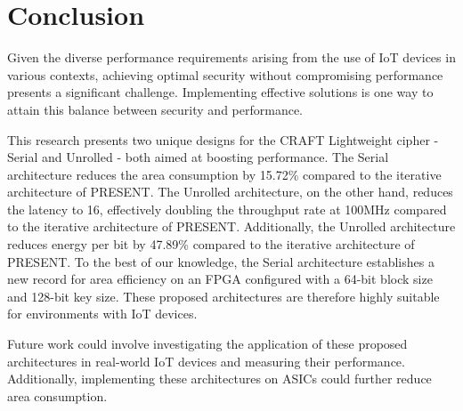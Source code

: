 \documentclass[final,5p,times,twocolumn]{elsarticle}
\begin{document}
\section{Conclusion}\label{sec6}

Given the diverse performance requirements arising from the use of IoT devices in various contexts, achieving optimal security without compromising performance presents a significant challenge. Implementing effective solutions is one way to attain this balance between security and performance.

This research presents two unique designs for the CRAFT Lightweight cipher - Serial and Unrolled - both aimed at boosting performance.
The Serial architecture reduces the area consumption by 15.72\% compared to the iterative architecture of PRESENT.
The Unrolled architecture, on the other hand, reduces the latency to 16, effectively doubling the throughput rate at 100MHz compared to the iterative architecture of PRESENT.
Additionally, the Unrolled architecture reduces energy per bit by 47.89\% compared to the iterative architecture of PRESENT.
To the best of our knowledge, the Serial architecture establishes a new record for area efficiency on an FPGA configured with a 64-bit block size and 128-bit key size.
These proposed architectures are therefore highly suitable for environments with IoT devices.

Future work could involve investigating the application of these proposed architectures in real-world IoT devices and measuring their performance. Additionally, implementing these architectures on ASICs could further reduce area consumption.



\end{document}
